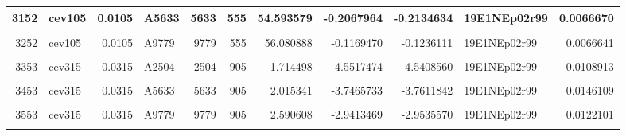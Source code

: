 \documentclass[
]{article}
\begin{document}
\begin{table}[!h]
{\begin{tabular}{r|l|r|l|r|r|r|r|r|l|r}
\hline
3152 & cev105 & 0.0105 & A5633 & 5633 & 555 & 54.593579 & -0.2067964 & -0.2134634 & 19E1NEp02r99 & 0.0066670\\
\hline
\cellcolor{gray!6}{3202} & \cellcolor{gray!6}{cev105} & \cellcolor{gray!6}{0.0105} & \cellcolor{gray!6}{A7274} & \cellcolor{gray!6}{7274} & \cellcolor{gray!6}{555} & \cellcolor{gray!6}{55.109790} & \cellcolor{gray!6}{-0.1740126} & \cellcolor{gray!6}{-0.1806320} & \cellcolor{gray!6}{19E1NEp02r99} & \cellcolor{gray!6}{0.0066194}\\
\hline
3252 & cev105 & 0.0105 & A9779 & 9779 & 555 & 56.080888 & -0.1169470 & -0.1236111 & 19E1NEp02r99 & 0.0066641\\
\hline
\cellcolor{gray!6}{3603} & \cellcolor{gray!6}{cev526} & \cellcolor{gray!6}{0.0526} & \cellcolor{gray!6}{A0} & \cellcolor{gray!6}{0} & \cellcolor{gray!6}{905} & \cellcolor{gray!6}{1.533025} & \cellcolor{gray!6}{-5.2530406} & \cellcolor{gray!6}{-5.2486887} & \cellcolor{gray!6}{19E1NEp02r99} & \cellcolor{gray!6}{0.0043519}\\
\hline
3353 & cev315 & 0.0315 & A2504 & 2504 & 905 & 1.714498 & -4.5517474 & -4.5408560 & 19E1NEp02r99 & 0.0108913\\
\hline
\cellcolor{gray!6}{3403} & \cellcolor{gray!6}{cev315} & \cellcolor{gray!6}{0.0315} & \cellcolor{gray!6}{A4145} & \cellcolor{gray!6}{4145} & \cellcolor{gray!6}{905} & \cellcolor{gray!6}{1.860521} & \cellcolor{gray!6}{-4.1039608} & \cellcolor{gray!6}{-4.1072736} & \cellcolor{gray!6}{19E1NEp02r99} & \cellcolor{gray!6}{0.0033128}\\
\hline
3453 & cev315 & 0.0315 & A5633 & 5633 & 905 & 2.015341 & -3.7465733 & -3.7611842 & 19E1NEp02r99 & 0.0146109\\
\hline
\cellcolor{gray!6}{3503} & \cellcolor{gray!6}{cev315} & \cellcolor{gray!6}{0.0315} & \cellcolor{gray!6}{A7274} & \cellcolor{gray!6}{7274} & \cellcolor{gray!6}{905} & \cellcolor{gray!6}{2.215003} & \cellcolor{gray!6}{-3.4101025} & \cellcolor{gray!6}{-3.4235413} & \cellcolor{gray!6}{19E1NEp02r99} & \cellcolor{gray!6}{0.0134388}\\
\hline
3553 & cev315 & 0.0315 & A9779 & 9779 & 905 & 2.590608 & -2.9413469 & -2.9535570 & 19E1NEp02r99 & 0.0122101\\
\hline
\cellcolor{gray!6}{3004} & \cellcolor{gray!6}{cev105} & \cellcolor{gray!6}{0.0105} & \cellcolor{gray!6}{A0} & \cellcolor{gray!6}{0} & \cellcolor{gray!6}{953} & \cellcolor{gray!6}{20.125381} & \cellcolor{gray!6}{-1.3249909} & \cellcolor{gray!6}{-1.3290865} & \cellcolor{gray!6}{19E1NEp02r99} & \cellcolor{gray!6}{0.0040957}\\

\end{tabular}}
\end{table}
\end{document}
